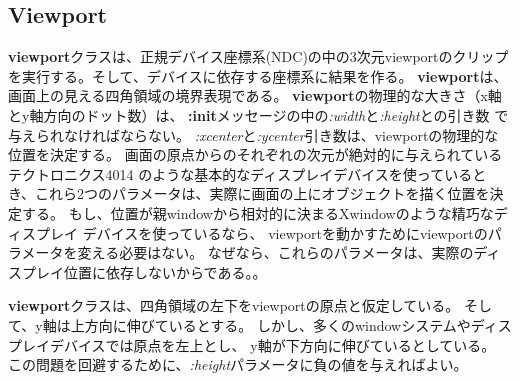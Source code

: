 \subsection{Viewport}

{\bf viewport}クラスは、正規デバイス座標系(NDC)の中の3次元viewportのクリップ
を実行する。そして、デバイスに依存する座標系に結果を作る。
{\bf viewport}は、画面上の見える四角領域の境界表現である。
{\bf viewport}の物理的な大きさ（x軸とy軸方向のドット数）は、
{\bf :init}メッセージの中の{\em :width}と{\em :height}との引き数
で与えられなければならない。
{\em :xcenter}と{\em :ycenter}引き数は、viewportの物理的な位置を決定する。
画面の原点からのそれぞれの次元が絶対的に与えられているテクトロニクス4014
のような基本的なディスプレイデバイスを使っているとき、これら2つのパラメータは、実際に画面の上にオブジェクトを描く位置を決定する。
もし、位置が親windowから相対的に決まるXwindowのような精巧なディスプレイ
デバイスを使っているなら、
viewportを動かすためにviewportのパラメータを変える必要はない。
なぜなら、これらのパラメータは、実際のディスプレイ位置に依存しないからである。。

{\bf viewport}クラスは、四角領域の左下をviewportの原点と仮定している。
そして、y軸は上方向に伸びているとする。
しかし、多くのwindowシステムやディスプレイデバイスでは原点を左上とし、
y軸が下方向に伸びているとしている。
この問題を回避するために、{\em :height}パラメータに負の値を与えればよい。


